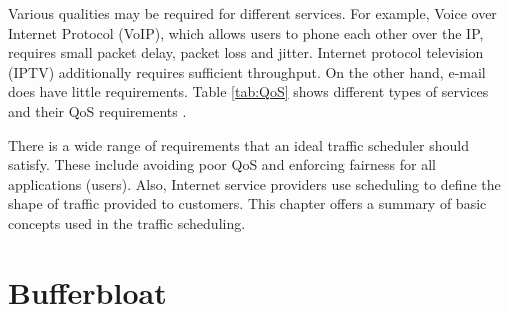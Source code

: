 Various qualities may be required for different services. For example, Voice over Internet Protocol (VoIP), which allows users to phone each other over the IP, requires small packet delay, packet loss and jitter. Internet protocol television (IPTV) additionally requires sufficient throughput. On the other hand, e-mail does have little requirements. Table \ref{tab:QoS} shows different types of services and their QoS requirements \cite{Tanenbaum:2002:CN:572404}.

\begin{table}
	\caption{Stringency of services’ quality-of-service requirements.}
	
	\label{tab:QoS}
	\centering
\end{table}


There is a wide range of requirements that an ideal traffic scheduler should satisfy. These include avoiding poor QoS and enforcing fairness for all applications (users). Also, Internet service providers use scheduling to define the shape of traffic provided to customers. This chapter offers a summary of basic concepts used in the traffic scheduling.

\section{Bufferbloat}
\label{chap:bb}

